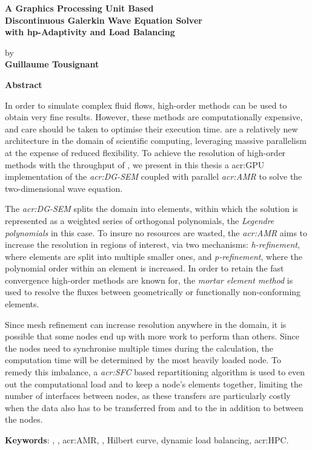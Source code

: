 \thispagestyle{plain} %

\begin{center}
	\vspace*{0.5cm} %
	{ \Large
		\textbf{A Graphics Processing Unit Based \\ 
			Discontinuous Galerkin Wave Equation Solver \\
			with hp-Adaptivity and Load Balancing \\
		}
	}
	\vspace{0.4cm}
	\large

	by \\
	\vspace{0.4cm}
	\textbf{Guillaume Tousignant}
	
	\vspace{0.9cm}
	\textbf{Abstract}
	
\end{center}

In order to simulate complex fluid flows, high-order methods can be used to obtain very fine
results. However, these methods are computationally expensive, and care should be taken to optimise
their execution time. \textit{} are a relatively new architecture in the domain
of scientific computing, leveraging massive parallelism at the expense of reduced flexibility. To
achieve the resolution of high-order methods with the throughput of , we present
in this thesis a \acrshort{acr:GPU} implementation of the \textit{\acrfull{acr:DG-SEM}} coupled with
parallel \textit{\acrfull{acr:AMR}} to solve the two-dimensional wave equation. 

The \textit{\acrlong{acr:DG-SEM}} splits the domain into elements,  within which the solution is
represented as a weighted series of orthogonal polynomials, the \textit{Legendre polynomials} in
this case. To insure no resources are wasted, the \textit{\acrlong{acr:AMR}} aims to increase the
resolution in regions of interest, via two mechanisms: \textit{h-refinement}, where elements are
split into multiple smaller ones, and \textit{p-refinement}, where the polynomial order within an
element is increased. In order to retain the fast convergence high-order methods are known for, the
\textit{mortar element method} is used to resolve the fluxes between geometrically or functionally
non-conforming elements.

Since mesh refinement can increase resolution anywhere in the domain, it is possible that some nodes
end up with more work to perform than others. Since the nodes need to synchronise multiple times
during the calculation, the computation time will be determined by the most heavily loaded node. To
remedy this imbalance, a \textit{\acrfull{acr:SFC}} based repartitioning algorithm is used to even
out the computational load and to keep a node's elements together, limiting the number of interfaces
between nodes, as these transfers are particularly costly when the data also has to be  transferred
from and to the  in addition to between the nodes.


\textbf{Keywords}: , , \acrlong{acr:AMR}, , Hilbert curve, dynamic load balancing, \acrlong{acr:HPC}.

 